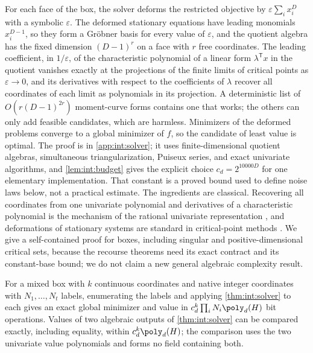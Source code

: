 For each face of the box, the solver deforms the restricted objective by
$\varepsilon\sum_ix_i^D$ with a symbolic $\varepsilon$. The deformed stationary
equations have leading monomials $x_i^{D-1}$, so they form a Gr\"obner basis
for every value of $\varepsilon$, and the quotient algebra has the fixed
dimension $(D-1)^r$ on a face with $r$ free coordinates. The leading
coefficient, in $1/\varepsilon$, of the characteristic polynomial of a linear
form $\lambda^{\mathsf T}x$ in the quotient vanishes exactly at the
projections of the finite limits of critical points as $\varepsilon\to0$, and
its derivatives with respect to the coefficients of $\lambda$ recover all
coordinates of each limit as polynomials in its projection. A deterministic
list of $O(r(D-1)^{2r})$ moment-curve forms contains one that works; the
others can only add feasible candidates, which are harmless. Minimizers of
the deformed problems converge to a global minimizer of $f$, so the candidate
of least value is optimal. The proof is in \cref{app:int:solver}; it uses
finite-dimensional quotient algebras, simultaneous triangularization, Puiseux
series, and exact univariate algorithms, and \cref{lem:int:budget} gives the
explicit choice $c_d=2^{10000D}$ for one elementary implementation. That
constant is a proved bound used to define noise laws below, not a practical
estimate. The ingredients are classical. Recovering all coordinates from one
univariate polynomial and derivatives of a characteristic polynomial is the
mechanism of the rational univariate representation \citep{rouillier1999-solving-zero-dimensional-systems-through},
and deformations of stationary systems are standard in critical-point
methods \citep{basu2006-algorithms-in-real-algebraic-geometry}. We give a self-contained proof for boxes,
including singular and positive-dimensional critical sets, because the
recourse theorems need its exact contract and its constant-base bound; we do
not claim a new general algebraic complexity result.

\begin{corollary}\label{cor:int:mixed-solver}
For a mixed box with $k$ continuous coordinates and native integer
coordinates with $N_1,\ldots,N_t$ labels, enumerating the labels and applying
\cref{thm:int:solver} to each gives an exact global minimizer and value in
$c_d^k\prod_iN_i\poly_d(H)$ bit operations. Values of two algebraic outputs
of \cref{thm:int:solver} can be compared exactly, including equality, within
$c_d^k\poly_d(H)$; the comparison uses the two univariate value polynomials
and forms no field containing both.
\end{corollary}

